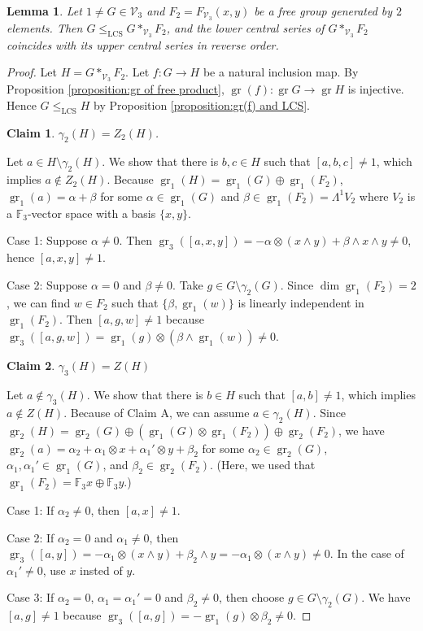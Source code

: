 \documentclass[11pt,reqno]{article}
\newtheorem{lemma}[theorem]{Lemma}
\newtheorem{claim}{Claim}[theorem]
\theoremstyle{definition}
\theoremstyle{remark}
\DeclareMathOperator{\gr}{gr}
\newcommand{\LCS}{\mathrm{LCS}}
\begin{document}
\begin{lemma}\label{lemma:coincidence of central series}
    Let $1\neq G\in \mathcal V_3$ and $F_2=F_{\mathcal V_3}(x,y)$ be a free group generated by $2$ elements.
    Then $G\leq_{\LCS}G*_{\mathcal V_3}F_2$, and the lower central series of
    $G*_{\mathcal V_3}F_2$ coincides with its upper central series in reverse
    order.
\end{lemma}

\begin{proof}
    Let $H=G*_{\mathcal V_3}F_2$.
    Let $f:G\to H$ be a natural inclusion map. By Proposition \ref{proposition:gr of free product}, $\gr(f):\gr G\to \gr H$ is injective. Hence $G\leq_\LCS H$ by Proposition \ref{proposition:gr(f) and LCS}.

    \begin{claim}
        $\gamma_2(H)=Z_2(H)$.
    \end{claim}
    Let $a\in H\setminus\gamma_2(H)$. We show that there is $b,c\in H$ such that $[a,b,c]\neq 1$, which implies $a\not\in Z_2(H)$.
    Because $\gr_1(H)=\gr_1(G)\oplus \gr_1(F_2)$, $\gr_1(a)=\alpha+\beta$ for some $\alpha\in \gr_1(G)$ and $\beta\in \gr_1(F_2)=\Lambda^1V_2$ where $V_2$ is a $\mathbb F_3$-vector space with a basis $\{x,y\}$.
    
    Case 1: Suppose $\alpha\neq 0$. Then $\gr_3([a,x,y])=-\alpha\otimes (x\wedge y)+\beta\wedge x\wedge y\neq 0$, hence $[a,x,y]\neq 1$.

    Case 2: Suppose $\alpha=0$ and $\beta \neq 0$. 
    Take $g \in G\setminus \gamma_2(G)$. 
    Since $\dim \gr_1(F_2)=2$, we can find  $w\in F_2$ such that $\{\beta, \gr_1(w)\}$ is linearly independent in $\gr_1(F_2)$.
    Then $[a,g,w]\neq 1$ because $\gr_3([a,g,w])=\gr_1(g) \otimes (\beta\wedge \gr_1(w)) \neq 0$.

    \begin{claim}
        $\gamma_3(H)=Z(H)$
    \end{claim}
    Let $a\not\in\gamma_3(H)$. We show that there is $b\in H$ such that $[a,b]\neq 1$, which implies $a\not\in Z(H)$.
    Because of Claim A, we can assume $a\in \gamma_2(H)$.
    Since $\gr_2(H)=\gr_2(G)\oplus (\gr_1(G)\otimes \gr_1(F_2))\oplus \gr_2(F_2)$,
    we have $\gr_2(a)=\alpha_2+ \alpha_1\otimes x+\alpha_1'\otimes y + \beta_2$ for some $\alpha_2\in\gr_2(G)$, $\alpha_1,\alpha_1'\in\gr_1(G)$, and $\beta_2\in\gr_2(F_2)$.
    (Here, we used that $\gr_1(F_2)=\mathbb F_3x\oplus \mathbb F_3 y$.)
    
    Case 1: If $\alpha_2\neq 0$, then $[a,x]\neq 1$.
    
    Case 2: If $\alpha_2=0$ and $\alpha_1\neq 0$, then $\gr_3([a,y])=-\alpha_1\otimes(x\wedge y)+\beta_2\wedge y=-\alpha_1\otimes(x\wedge y)\neq 0$. In the case of $\alpha_1'\neq 0$, use $x$ insted of $y$.

    Case 3: If $\alpha_2=0$, $\alpha_1=\alpha_1'=0$ and $\beta_2\neq 0$, then choose $g\in G\setminus \gamma_2(G)$. We have $[a,g]\neq 1$ because $\gr_3([a,g])=-\gr_1(g)\otimes \beta_2\neq 0$.
\end{proof}
\end{document}
